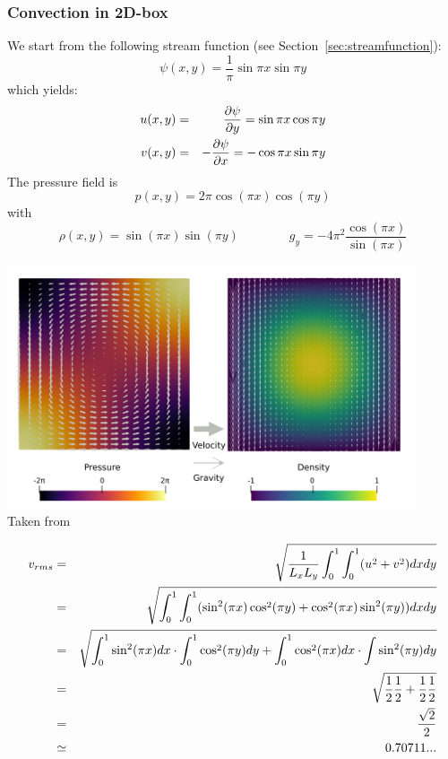 \subsubsection{Convection in 2D-box} \label{sec:citb}

We start from the following stream function (see Section~\ref{sec:streamfunction}):
\begin{equation}
\psi(x,y)=\frac{1}{\pi} \sin \pi x \sin \pi y
\end{equation}
which yields:
\begin{eqnarray}
u(x,y)&=&\frac{\partial \psi}{\partial y} = \sin \pi x \cos \pi y \nonumber\\
v(x,y)&=&-\frac{\partial \psi}{\partial x} = - \cos \pi x \sin \pi y
\end{eqnarray}
The pressure field is 
\begin{equation}
p(x,y) = 2\pi \cos (\pi x) \cos (\pi y) 
\end{equation}
with 
\begin{equation}
\rho(x,y)=\sin(\pi x) \sin (\pi y)
\qquad\qquad
g_y = -4\pi ^2 \frac{\cos (\pi x)}{\sin (\pi x)}
\end{equation}

\begin{center}
\includegraphics[width=12cm]{images/benchmark_convbox/galb19}\\
{\captionfont Taken from \cite{galb19}}
\end{center}

\begin{eqnarray}
v_{rms} 
&=& \sqrt{\frac{1}{L_xL_y} \int_0^1 \int_0^1 (u^2+v^2) dxdy} \nonumber\\
&=& \sqrt{\int_0^1 \int_0^1 ( \sin^2 (\pi x) \cos^2 (\pi y) + \cos^2 (\pi x) \sin^2 (\pi y) ) dxdy} \nonumber\\
&=& \sqrt{ \int_0^1 \sin^2 (\pi x) dx  \cdot \int_0^1 \cos^2 (\pi y) dy + \int_0^1 \cos^2 (\pi x) dx \cdot \int \sin^2 (\pi y) dy } \nonumber\\
&=& \sqrt{\frac{1}{2} \frac{1}{2}+ \frac{1}{2} \frac{1}{2} }\nonumber\\
&=& \frac{\sqrt{2}}{2} \nonumber\\
&\simeq& 0.70711...
\end{eqnarray}


